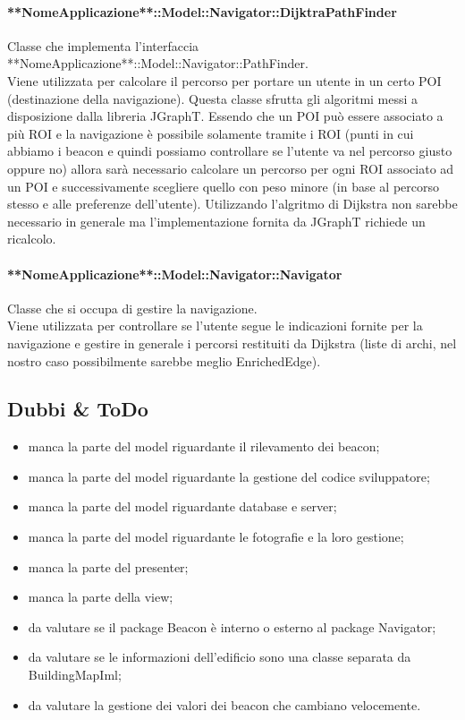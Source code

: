 \documentclass[../SpecificaTecnica.tex]{subfiles}
\begin{document}
				\paragraph{**NomeApplicazione**::Model::Navigator::DijktraPathFinder}
					Classe che implementa l'interfaccia **NomeApplicazione**::Model::Navigator::PathFinder. \\
					Viene utilizzata per calcolare il percorso per portare un utente in un certo POI (destinazione della navigazione). Questa classe sfrutta gli algoritmi messi a disposizione dalla libreria JGraphT. Essendo che un POI può essere associato a più ROI e la navigazione è possibile solamente tramite i ROI (punti in cui abbiamo i beacon e quindi possiamo controllare se l'utente va nel percorso giusto oppure no) allora sarà necessario calcolare un percorso per ogni ROI associato ad un POI e successivamente scegliere quello con peso minore (in base al percorso stesso e alle preferenze dell'utente). Utilizzando l'algritmo di Dijkstra non sarebbe necessario in generale ma l'implementazione fornita da JGraphT richiede un ricalcolo.
				\paragraph{**NomeApplicazione**::Model::Navigator::Navigator}
					Classe che si occupa di gestire la navigazione. \\
					Viene utilizzata per controllare se l'utente segue le indicazioni fornite per la navigazione e gestire in generale i percorsi restituiti da Dijkstra (liste di archi, nel nostro caso possibilmente sarebbe meglio EnrichedEdge).
	\subsection{Dubbi \& ToDo}
		\begin{itemize}
			\item manca la parte del model riguardante il rilevamento dei beacon;
			\item manca la parte del model riguardante la gestione del codice sviluppatore;
			\item manca la parte del model riguardante database e server;
			\item manca la parte del model riguardante le fotografie e la loro gestione;
			\item manca la parte del presenter;
			\item manca la parte della view;
			\item da valutare se il package Beacon è interno o esterno al package Navigator;
			\item da valutare se le informazioni dell'edificio sono una classe separata da BuildingMapIml;
			\item da valutare la gestione dei valori dei beacon che cambiano velocemente.
		\end{itemize}
\end{document}
